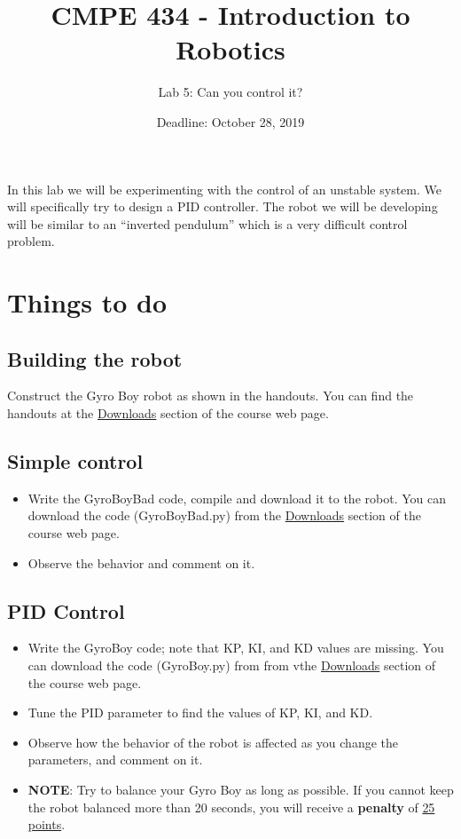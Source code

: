 \documentclass{scrartcl}
\title{CMPE 434 - Introduction to Robotics}
\subtitle{Lab 5: Can you control it?}
\date{Deadline: October 28, 2019}
\begin{document}
\maketitle

In this lab we will be experimenting with the control of an unstable
system. We will specifically try to design a PID controller. The robot
we will be developing will be similar to an ``inverted pendulum'' which
is a very difficult control problem.

\section{Things to do}

\subsection{Building the robot}
  Construct the Gyro Boy robot as shown in the handouts. You can find the handouts at the \href{http://robot.cmpe.boun.edu.tr/~cmpe434/doku.php?id=downloads#control}{Downloads} section of the course web page.

\subsection{ Simple control}

  \begin{itemize}
    \item Write the GyroBoyBad code, compile and download it to the robot. You can download the code (GyroBoyBad.py) from
    the \href{http://robot.cmpe.boun.edu.tr/~cmpe434/doku.php?id=downloads#control}{Downloads} section of the course web page.

    \item Observe the behavior and comment on it.
  \end{itemize}

\subsection{PID Control}
  \begin{itemize}
    \item Write the GyroBoy code; note that KP, KI, and KD values are missing. You can download the code (GyroBoy.py) from from vthe \href{http://robot.cmpe.boun.edu.tr/~cmpe434/doku.php?id=downloads#control}{Downloads} section of the course web page.
    \item Tune the PID parameter to find the values of KP, KI, and KD.
    \item Observe how the behavior of the robot is affected as you change the parameters, and comment on it.
    \item \textbf{NOTE}: Try to balance your Gyro Boy as long as possible. If you cannot keep the robot balanced more than 20 seconds, you will receive a \textbf{penalty} of \underline{25 points}.
  \end{itemize}
\end{document}
